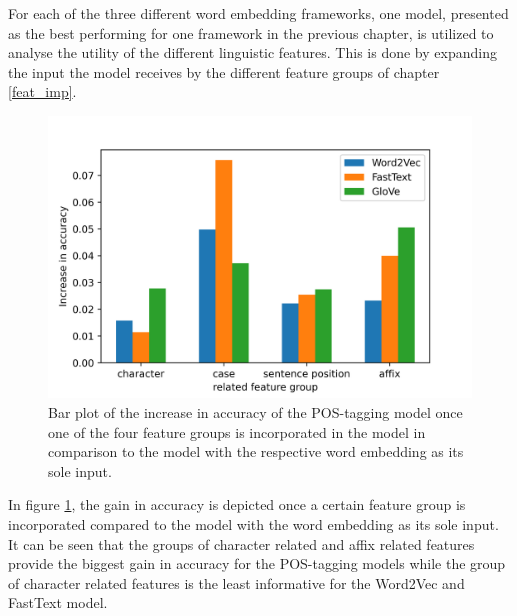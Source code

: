 For each of the three different word embedding frameworks, one model, presented as the best performing for one framework in the previous chapter, is utilized to analyse the utility of the different linguistic features. This is done by expanding the input the model receives by the different feature groups of chapter \ref{feat_imp}.

\begin{figure}
    \includegraphics[width=\linewidth]{Pictures/accuracy_gain.png}
    \caption{Bar plot of the increase in accuracy of the POS-tagging model once one of the four feature groups is incorporated in the model in comparison to the model with the respective word embedding as its sole input.}
    \label{fig:acc}
\end{figure}


In figure \ref{fig:acc}, the gain in accuracy is depicted once a certain feature group is incorporated compared to the model with the word embedding as its sole input. It can be seen that the groups of character related and affix related features provide the biggest gain in accuracy for the POS-tagging models while the group of character related features is the least informative for the Word2Vec and FastText model.

